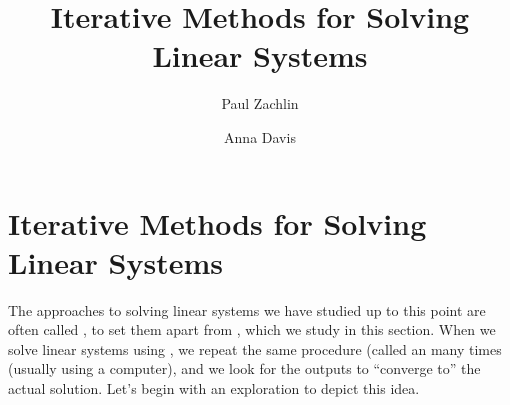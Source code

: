 \documentclass{ximera}
\author{Paul Zachlin \and Anna Davis} \title{Iterative Methods for Solving Linear Systems} \license{CC-BY 4.0}
\begin{document}
\begin{abstract}

\end{abstract}
\maketitle
\section*{Iterative Methods for Solving Linear Systems}

The approaches to solving linear systems we have studied up to this point are often called , to set them apart from , which we study in this section.  When we solve linear systems using , we repeat the same procedure (called an  many times (usually using a computer), and we look for the outputs to ``converge to'' the actual solution.  Let's begin with an exploration to depict this idea.
\end{document}
